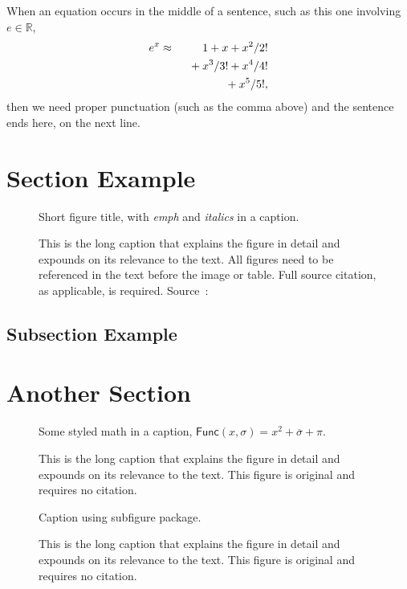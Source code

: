 \lipsum*[65]

When an equation occurs in the middle of a sentence, such as this one involving $e \in \mathbb{R}$,
\begin{eqnarray}
 e^x &\approx& 1+x+x^2/2! \nonumber \\
   && \hphantom{1} + x^3/3! + x^4/4! \nonumber \\
   && \hphantom{1} + x^5/5!,
\end{eqnarray}
then we need proper punctuation (such as the comma above) and the sentence ends here, on the next line.

\section{Section Example}
\lipsum[47]

\begin{figure}[!htb]
\framebox[\textwidth]{\parbox{\textwidth}{\lipsum[65]}}
\caption{Short figure title, with \emph{emph} and \textit{italics} in a caption.}
\caption*{\small This is the long caption that explains the figure in detail and
expounds on its relevance to the text.
All figures need to be referenced in the text before the image or table.
Full source citation, as applicable, is required.
Source~\cite{IEEEexample:bibtexguide}: }
\end{figure}

\subsection{Subsection Example}
\lipsum[56]

\section{Another Section}
\lipsum[55-56]

\begin{figure}[!htb]
\framebox[\textwidth]{\parbox{\textwidth}{\lipsum[65]}}
\caption{Some styled math in a caption, $\mathsf{Func}(x, \sigma) = x^2 + \overline{\sigma} + \pi$.}
\caption*{\small This is the long caption that explains the figure in detail
and expounds on its relevance to the text.
This figure is original and requires no citation.}
\end{figure}

\begin{figure}[!htb]
\centering
{}
\hfill
{}
\caption{Caption using subfigure package.}
\caption*{\small This is the long caption that explains the figure in detail
and expounds on its relevance to the text.
This figure is original and requires no citation.}
\end{figure}


